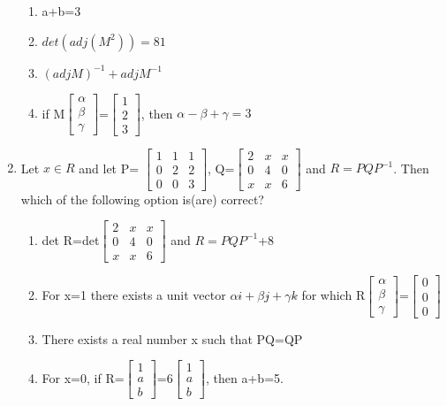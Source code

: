 \begin{enumerate}[label=\arabic*.,ref=\thesubsection.\theenumi]
\begin{enumerate}
 \item a+b=3
 \item $det(adj(M^2)) = 81$
 \item $(adjM)^{-1} + adjM^{-1}$
 \item if M$\begin{bmatrix} \alpha  \\ \beta \\\gamma \end{bmatrix}$=$\begin{bmatrix} 1  \\ 2 \\3 \end{bmatrix}$, then $\alpha-\beta+\gamma=3$
\end{enumerate}
\item Let $x\in R$ and let P= $\begin{bmatrix} 1 & 1 & 1  \\ 0 & 2 &2 \\0 & 0 & 3 \end{bmatrix}$, Q=$\begin{bmatrix} 2 & x & x  \\ 0 & 4 & 0 \\x & x & 6 \end{bmatrix}$ and $R=PQP^{-1}$. Then which of the following option is(are) correct?
\begin{enumerate}
\item det R=det$\begin{bmatrix} 2 & x & x  \\ 0 & 4 & 0 \\x & x & 6 \end{bmatrix}$ and $R=PQP^{-1}$+8 
\item For x=1 there exists a unit vector $\alpha i\hat{}+\beta j\hat{}+\gamma k\hat{}$ for which R$\begin{bmatrix} \alpha \\ \beta \\\gamma \end{bmatrix}$=$\begin{bmatrix} 0  \\  0 \\ 0  \end{bmatrix}$
\item There exists a real number x such that PQ=QP
\item For x=0, if R=$\begin{bmatrix} 1  \\  a \\ b  \end{bmatrix}$=6$\begin{bmatrix} 1  \\  a \\ b  \end{bmatrix}$, then a+b=5.

\end{enumerate}
\end{enumerate}
